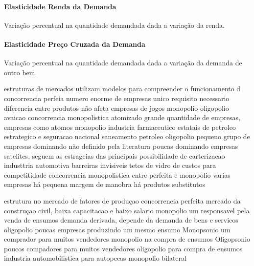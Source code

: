 \documentclass{article}
\begin{document}
                \paragraph{Elasticidade Renda da Demanda}Variação percentual na quantidade demandada dada a variação da renda.
                \paragraph{Elasticidade Preço Cruzada da Demanda}Variação percentual na quantidade demandada dada a variação da demanda de outro bem.

            estruturas de mercados utilizam modelos para compreender o funcionamento d
            concorrencia perfeia
                numero enorme de empresas unico requisito necessario
                diferencia entre produtos não afeta
                empresas de jogos
            monopolio
            oligopolio
                avaicao
            concorrencia monopolistica
            atomizado grande quantidade de empresas, empresas como atomos
            monopolio industria farmaceutico
                estatais de petroleo estrategico e seguracao nacional saneamento
                petroleo
            oligopolio
                pequeno grupo de empresas dominando
                não definido pela literatura
                poucas dominando
                empresas satelites, seguem as estrageias das principais
                possibilidade de carterizacao
                industtria automotiva
                barreiras invisiveis tetos de vidro de custos para competitidade
            concorrencia monopolistica
                entre perfeita e monopolio
                varias empresas
                há pequena margem de manobra
                há produtos substitutos
            
            estrutura no mercado de fatores de produçao
            concorrencia perfeita
                mercado da construçao civil, baixa capacitacao e baixo salario
            monopolio
                um responsavel pela venda de ensumos
                demanda derivada, depende da demanda de bens e servicos
            oligopolio
                poucas empresas produzindo um mesmo ensumo
            Monopsonio
                um comprador para muitos vendedores
                monopolio na compra de ensumos
            Oligopsonio
                poucos compadores para muitos vendedores
                oligopolio para compra de ensumos
                industria automobilistica para autopecas
            monopolio bilateral
\end{document}
